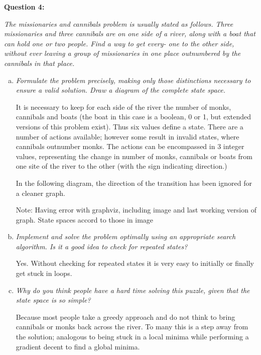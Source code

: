 \newpage
\textbf{Question 4:}

\emph{The missionaries and cannibals problem is usually stated as follows. Three missionaries and three cannibals are on one side of a river, along with a boat that can hold one or two people. Find a way to get every- one to the other side, without ever leaving a group of missionaries in one place outnumbered by the cannibals in that place.}

\begin{enumerate}[a)]
\item \emph{Formulate the problem precisely, making only those distinctions necessary to ensure a valid solution. Draw a diagram of the complete state space.}

It is necessary to keep for each side of the river the number of monks, cannibals and boats (the boat in this case is a boolean, 0 or 1, but extended versions of this problem exist). Thus six values define a state. There are a number of actions available; however some result in invalid states, where cannibals outnumber monks. The actions can be encompassed in 3 integer values, representing the change in number of monks, cannibals or boats from one site of the river to the other (with the sign indicating direction.)

In the following diagram, the direction of the transition has been ignored for a cleaner graph.

Note: Having error with graphviz, including image and last working version of graph. State spaces accord to those in image

\item \emph{Implement and solve the problem optimally using an appropriate search algorithm. Is it a good idea to check for repeated states?}

Yes. Without checking for repeated states it is very easy to initially or finally get stuck in loops.

\item \emph{Why do you think people have a hard time solving this puzzle, given that the state space is so simple?}

Because most people take a greedy approach and do not think to bring cannibals or monks back across the river. To many this is a step away from the solution; analogous to being stuck in a local minima while performing a gradient decent to find a global minima.  

\end{enumerate}


